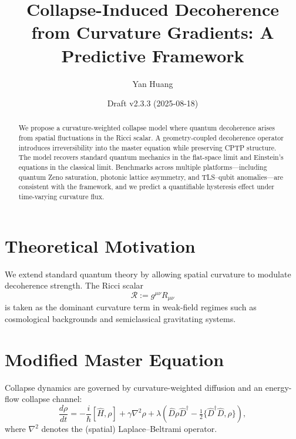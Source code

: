 \documentclass[aps,prl,twocolumn,nofootinbib]{revtex4-2}
\begin{document}
\title{Collapse-Induced Decoherence from Curvature Gradients: A Predictive Framework}
\author{Yan Huang}
\date{Draft v2.3.3 (2025-08-18)}

\begin{abstract}
We propose a curvature-weighted collapse model where quantum decoherence arises from spatial fluctuations in the Ricci scalar. A geometry-coupled decoherence operator introduces irreversibility into the master equation while preserving CPTP structure. The model recovers standard quantum mechanics in the flat-space limit and Einstein’s equations in the classical limit. Benchmarks across multiple platforms---including quantum Zeno saturation, photonic lattice asymmetry, and TLS--qubit anomalies---are consistent with the framework, and we predict a quantifiable hysteresis effect under time-varying curvature flux.
\end{abstract}

\maketitle

\section{Theoretical Motivation}

We extend standard quantum theory by allowing spatial curvature to modulate decoherence strength. The Ricci scalar
\begin{equation}
\mathcal{R} := g^{\mu\nu} R_{\mu\nu}
\end{equation}
is taken as the dominant curvature term in weak-field regimes such as cosmological backgrounds and semiclassical gravitating systems.

\section{Modified Master Equation}

Collapse dynamics are governed by curvature-weighted diffusion and an energy-flow collapse channel:
\begin{equation}
\frac{d\rho}{dt} = -\frac{i}{\hbar}[\hat{H},\rho]
+ \gamma \nabla^2\rho
+ \lambda\!\left(\hat{D}\rho\hat{D}^\dagger - \tfrac{1}{2}\{\hat{D}^\dagger\hat{D},\rho\}\right),
\end{equation}
where $\nabla^2$ denotes the (spatial) Laplace--Beltrami operator.
\end{document}
